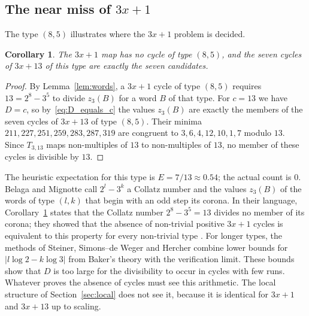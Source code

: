 \documentclass[12pt]{amsart}
\newtheorem{corollary}{Corollary}
\theoremstyle{definition}
\theoremstyle{remark}
\begin{document}
\subsection*{The near miss of \texorpdfstring{$3x+1$}{3x+1}}
The type $(8,5)$ illustrates where the $3x+1$ problem is decided.

\begin{corollary}
\label{cor:near_miss}
The $3x+1$ map has no cycle of type $(8,5)$, and the seven cycles of $3x+13$ of this type are exactly the seven candidates.
\end{corollary}

\begin{proof}
By Lemma~\ref{lem:words}, a $3x+1$ cycle of type $(8,5)$ requires $13=2^8-3^5$ to divide $z_3(B)$ for a word $B$ of that type. For $c=13$ we have $D=c$, so by~\eqref{eq:D_equals_c} the values $z_3(B)$ are exactly the members of the seven cycles of $3x+13$ of type $(8,5)$. Their minima $211,227,251,259,283,287,319$ are congruent to $3,6,4,12,10,1,7$ modulo $13$. Since $T_{3,13}$ maps non-multiples of $13$ to non-multiples of $13$, no member of these cycles is divisible by $13$.
\end{proof}

The heuristic expectation for this type is $E=7/13\approx0.54$; the actual count is $0$. Belaga and Mignotte call $2^l-3^k$ a Collatz number and the values $z_3(B)$ of the words of type $(l,k)$ that begin with an odd step its corona. In their language, Corollary~\ref{cor:near_miss} states that the Collatz number $2^8-3^5=13$ divides no member of its corona; they showed that the absence of non-trivial positive $3x+1$ cycles is equivalent to this property for every non-trivial type \cite[Theorem~5]{Belaga_Mignotte_DMTCS_2006}. For longer types, the methods of Steiner, Simons--de Weger and Hercher \cite{Steiner_1977,Simons_deWeger_2005,Hercher_2023} combine lower bounds for $|l\log2-k\log3|$ from Baker's theory with the verification limit. These bounds show that $D$ is too large for the divisibility to occur in cycles with few runs. Whatever proves the absence of cycles must see this arithmetic. The local structure of Section~\ref{sec:local} does not see it, because it is identical for $3x+1$ and $3x+13$ up to scaling.
\end{document}
